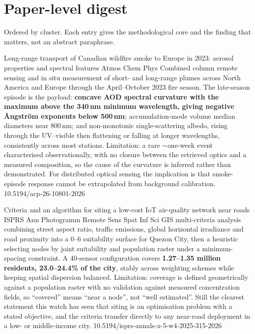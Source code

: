 \documentclass[10pt]{article}
\begin{document}
\clearpage

\section*{\sffamily\bfseries\color{Deep}Paper-level digest}
\vspace{-1.5mm}{\color{Amber}\rule{\linewidth}{1.1pt}}\vspace{1mm}

{\fontsize{7.4}{9}\selectfont\color{Slate}Ordered by cluster. Each entry gives the
methodological core and the finding that matters, not an abstract paraphrase.\par}


{Long-range transport of Canadian wildfire smoke to Europe in 2023: aerosol properties
and spectral features}
{Atmos Chem Phys}
{Combined column remote sensing and in situ measurement of short- and long-range plumes
across North America and Europe through the April--October 2023 fire season. The
late-season episode is the payload: \textbf{concave AOD spectral curvature with the
maximum above the 340\,nm minimum wavelength, giving negative \AA ngstr\"om exponents
below 500\,nm}; accumulation-mode volume median diameters near 800\,nm; and
non-monotonic single-scattering albedo, rising through the UV--visible then flattening or
falling at longer wavelengths, consistently across most stations. Limitation: a rare
$\sim$one-week event characterised observationally, with no closure between the retrieved
optics and a measured composition, so the cause of the curvature is inferred rather than
demonstrated. For distributed optical sensing the implication is that smoke-episode
response cannot be extrapolated from background calibration.}
{10.5194/acp-26-10801-2026}

{Criteria and an algorithm for siting a low-cost IoT air-quality network near roads}
{ISPRS Ann Photogramm Remote Sens Spat Inf Sci}
{GIS multi-criteria analysis combining street aspect ratio, traffic emissions, global
horizontal irradiance and road proximity into a 0--6 suitability surface for Quezon City,
then a heuristic selecting nodes by joint suitability and population raster under a
minimum-spacing constraint. A 40-sensor configuration covers \textbf{1.27--1.35 million
residents, 23.0--24.4\% of the city}, stably across weighting schemes while keeping
spatial dispersion balanced. Limitation: coverage is defined geometrically against a
population raster with no validation against measured concentration fields, so
``covered'' means ``near a node'', not ``well estimated''. Still the clearest statement
this watch has seen that siting is an optimisation problem with a stated objective, and
the criteria transfer directly to any near-road deployment in a low- or middle-income
city.}
{10.5194/isprs-annals-x-5-w4-2025-315-2026}
\end{document}
